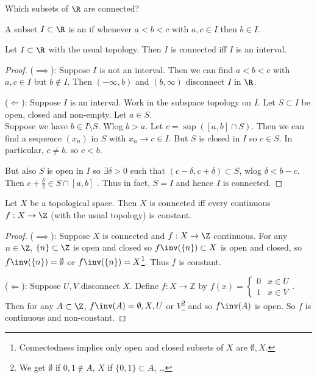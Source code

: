 \begin{question}
    Which subsets of $\R$ are connected?
\end{question}

\begin{definition}[Interval]
    A subset $I\subset \R$ is an  if whenever $a<b<c$ with $a, c \in I$ then $b \in I$.
\end{definition}

\begin{proposition} \label{prp:41}
    Let $I\subset \R$ with the usual topology. Then $I$ is connected iff $I$ is an interval.
\end{proposition}

\begin{proof}
    ($\implies$): Suppose $I$ is not an interval. Then we can find $a<b<c$ with $a,c\in I$ but $b\not\in I$. Then $(-\infty,b)$ and $(b,\infty)$ disconnect $I$ in $\R$.

    ($\Longleftarrow$): Suppose $I$ is an interval. Work in the subspace topology on $I$. Let $S\subset I$ be open, closed and non-empty. Let $a\in S$. \\
    Suppose we have $b\in I\setminus S$. Wlog $b>a$. Let $c=\sup([a,b]\cap S)$. Then we can find a sequence $(x_n)$ in $S$ with $x_n\to c\in I$. But $S$ is closed in $I$ so $c\in S$. In particular, $c\neq b$. so $c<b$.

    But also $S$ is open in $I$ so $\exists \delta>0$ such that $(c-\delta, c+\delta)\subset S$, wlog $\delta < b-c$. Then $c +\frac{\delta}{2}\in S\cap [a,b]$ \Lightning.
    Thus in fact, $S=I$ and hence $I$ is connected.
\end{proof}

\begin{theorem} \label{thm:42}
    Let $X$ be a topological space. Then $X$ is connected iff every continuous $f: X\to \Z$ (with the usual topology) is constant.
\end{theorem}

\begin{proof}
    ($\implies$): Suppose $X$ is connected and $f:X\to \Z$ continuous. For any $n\in \Z$, $\set{n}\subset \Z$ is open and closed so $f\inv(\set{n})\subset X$ is open and closed, so $f\inv(\set{n})= \emptyset$ or $f\inv(\set{n}) = X$\footnote{Connectedness implies only open and closed subsets of $X$ are $\emptyset, X$.}. Thus $f$ is constant.

    ($\Longleftarrow$): Suppose $U,V$ disconnect $X$. Define $f:X \to \mathbb{Z}$ by $f(x) = \begin{cases}
        0 & x \in U \\
        1 & x \in V
    \end{cases}$.
    Then for any $A\subset \Z$, $f\inv(A) = \emptyset,X,U$ or $V$\footnote{We get $\emptyset$ if $0, 1 \notin A$, $X$ if $\{0, 1\} \subset A$, \dots} and so $f\inv(A)$ is open. So $f$ is continuous and non-constant.
    \end{proof}

